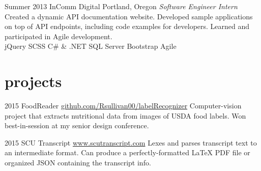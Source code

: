 \documentclass[]{friggeri-cv} %
\begin{document}
\begin{entrylist}
\entry
{Summer 2013}
{InComm Digital}
{Portland, Oregon}
{\emph{Software Engineer Intern} \\
Created a dynamic API documentation website. Developed sample applications on top of API endpoints, including code examples for developers. Learned and participated in Agile development.\\
jQuery \mydot SCSS \mydot C\# \& .NET \mydot SQL Server \mydot Bootstrap \mydot Agile}
%


\end{entrylist}


\section{projects}

\begin{entrylist}

\entry
{2015}
{FoodReader}
{\href{https://github.com/Rsullivan00/labelRecognizer}{github.com/Rsullivan00/labelRecognizer}}
{Computer-vision project that extracts nutritional data from images of USDA food labels. Won best-in-session at my senior design conference.}

\entry
{2015}
{SCU Transcript}
{\href{http://www.scutranscript.com}{www.scutranscript.com}}
{Lexes and parses transcript text to an intermediate format. Can produce a perfectly-formatted LaTeX PDF file or organized JSON containing the transcript info.}


\end{entrylist}
\end{document}
